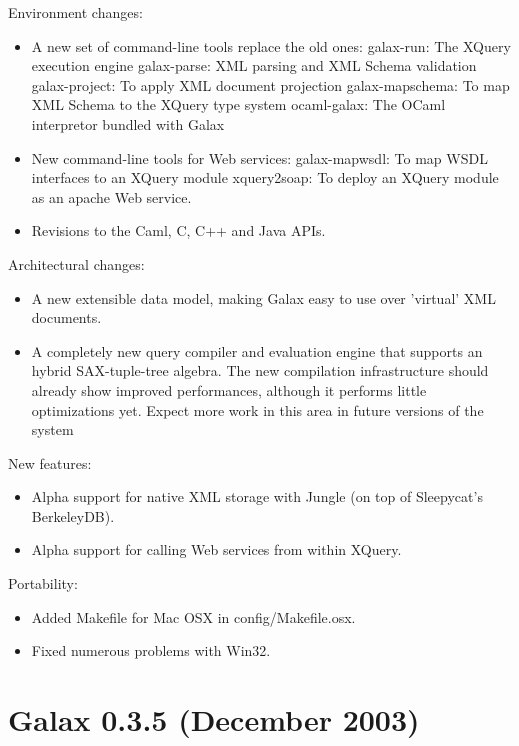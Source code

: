 Environment changes:
\begin{itemize}
\item A new set of command-line tools replace the old ones:
    galax-run:       The XQuery execution engine
    galax-parse:     XML parsing and XML Schema validation
    galax-project:   To apply XML document projection
    galax-mapschema: To map XML Schema to the XQuery type system
    ocaml-galax:     The OCaml interpretor bundled with Galax
\item New command-line tools for Web services:
    galax-mapwsdl:   To map WSDL interfaces to an XQuery module
    xquery2soap:     To deploy an XQuery module as an apache Web
                     service.
\item Revisions to the Caml, C, C++ and Java APIs.
\end{itemize}

Architectural changes:
\begin{itemize}
\item A new extensible data model, making Galax easy to use over 'virtual'
  XML documents.
\item A completely new query compiler and evaluation engine that supports
  an hybrid SAX-tuple-tree algebra. The new compilation infrastructure
  should already show improved performances, although it performs
  little optimizations yet. Expect more work in this area in future
  versions of the system
\end{itemize}

New features:
\begin{itemize}
\item Alpha support for native XML storage with Jungle (on top of
  Sleepycat's BerkeleyDB).
\item Alpha support for calling Web services from within XQuery.
\end{itemize}

Portability:
\begin{itemize}
\item Added Makefile for Mac OSX in config/Makefile.osx.
\item Fixed numerous problems with Win32.
\end{itemize}


\section{Galax 0.3.5 (December 2003)}

